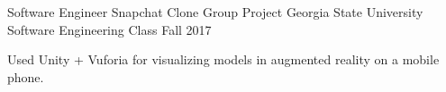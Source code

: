 

\begin{cventries}

  \cventry
    {Software Engineer} %
	{Snapchat Clone Group Project} %
    {Georgia State University Software Engineering Class} %
    {Fall 2017} %
    {
      \begin{cvitems} %
        \item {Used Unity + Vuforia for visualizing models in augmented reality on a mobile phone.}
      \end{cvitems}
    }
\end{cventries}
